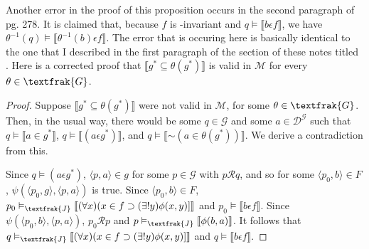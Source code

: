\documentclass{article}
\newcommand*{\oldneg}{\mathord{\sim}}
\newcommand{\lbc}{\llbracket}
\newcommand{\rbc}{\rrbracket}
\theoremstyle{definition}
\begin{document}
Another error in the proof of this proposition occurs in the second paragraph of pg. 278.
It is claimed that, because 
$f$ is -invariant and $q\vDash\lbc b\epsilon f\rbc$, we have
$\theta^{-1}(q)\vDash\lbc\theta^{-1}(b)\epsilon f\rbc$. The error that is occuring here is basically identical to the one 
that I described in the first paragraph of the section of these notes titled . Here is a corrected proof that 
$\lbc g^*\subseteq\theta(g^*)\rbc$ is valid in $\mathcal{M}$ for every $\theta\in\textfrak{G}$.

\begin{proof}
Suppose $\lbc g^*\subseteq\theta(g^*)\rbc$ were not valid in $\mathcal{M}$, for some $\theta\in\textfrak{G}$. Then, in the usual way, 
there would be some $q\in\mathcal{G}$ and some $a\in\mathcal{D}^\mathcal{G}$ such that
$q\vDash\lbc a\in g^*\rbc$, $q\vDash\lbc(a\epsilon g^*)\rbc$, and $q\vDash\lbc\oldneg(a\in\theta(g^*))\rbc$. We derive a contradiction from 
this.

Since $q\vDash(a\epsilon g^*)$, $\langle p,a\rangle\in g$ for some $p\in\mathcal{G}$ with $p\mathcal{R}q$, and so for some 
$\langle p_0,b\rangle\in F$, $\psi(\langle p_0,g\rangle,\langle p,a\rangle)$ is true. Since $\langle p_0,b\rangle\in F$, 
$p_0\vDash_\textfrak{J}\lbc(\forall x)(x\in f\supset(\exists !y)\phi(x,y)]\rbc$ and 
$p_0\vDash\lbc b\epsilon f\rbc$. Since $\psi(\langle p_0,b\rangle,\langle p,a\rangle)$, $p_0\mathcal{R}p$ and 
$p\vDash_\textfrak{J}\lbc\phi(b,a)\rbc$. It follows that
$q\vDash_\textfrak{J}\lbc(\forall x)(x\in f\supset(\exists !y)\phi(x,y)]\rbc$ and $q\vDash\lbc b\epsilon f\rbc$.


\end{proof}
\end{document}
